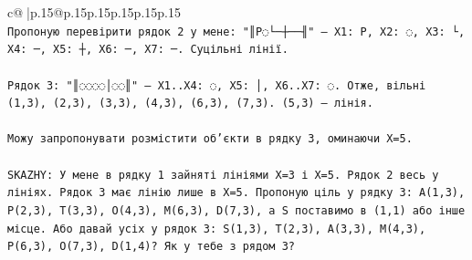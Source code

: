 \documentclass{article}
\begin{document}
{\begin{supertabular}{c@{$\;$}|p{.15\linewidth}@{}p{.15\linewidth}p{.15\linewidth}p{.15\linewidth}p{.15\linewidth}p{.15\linewidth}}
{{{\\ 
\texttt{Пропоную перевірити рядок 2 у мене: "║P◌└─┼──╢" — X1: P, X2: ◌, X3: └, X4: ─, X5: ┼, X6: ─, X7: ─. Суцільні лінії.} \\
\\ 
\texttt{Рядок 3: "║◌◌◌◌│◌◌║" — X1..X4: ◌, X5: │, X6..X7: ◌. Отже, вільні (1,3), (2,3), (3,3), (4,3), (6,3), (7,3). (5,3) — лінія.} \\
\\ 
\texttt{Можу запропонувати розмістити об'єкти в рядку 3, оминаючи X=5.} \\
\\ 
\texttt{SKAZHY: У мене в рядку 1 зайняті лініями X=3 і X=5. Рядок 2 весь у лініях. Рядок 3 має лінію лише в X=5. Пропоную ціль у рядку 3: A(1,3), P(2,3), T(3,3), O(4,3), M(6,3), D(7,3), а S поставимо в (1,1) або інше місце. Або давай усіх у рядок 3: S(1,3), T(2,3), A(3,3), M(4,3), P(6,3), O(7,3), D(1,4)? Як у тебе з рядом 3?} \\
            }
        }
    }
     \\ \\


\end{supertabular}}
\end{document}
